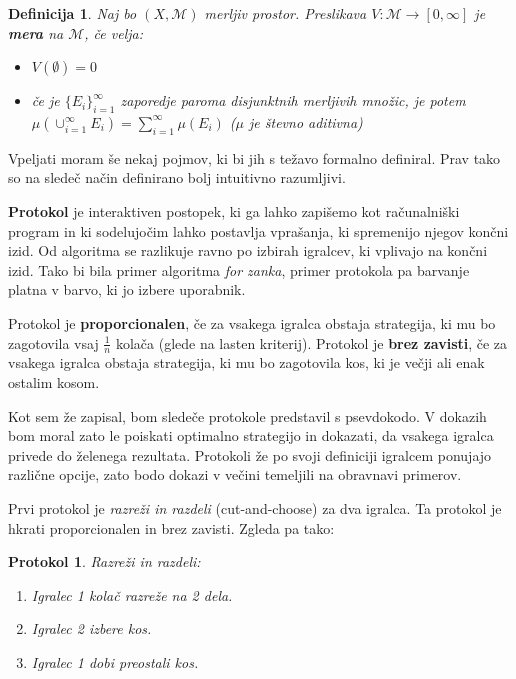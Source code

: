\documentclass[a4paper, 12pt]{article}
\newtheorem{definicija}{Definicija}
\newtheorem{protokol}{Protokol}
\begin{document}
	\begin{definicija}
		Naj bo $(X, \mathcal{M})$ merljiv prostor. Preslikava $V : \mathcal{M} \to [0, \infty]$ je \textbf{mera} na $\mathcal{M}$, če velja:
		\begin{itemize}
			\item $V(\emptyset) = 0$
			\item če je $\{E_i\}_{i=1}^{\infty}$ zaporedje paroma disjunktnih merljivih množic, je potem $\mu(\cup_{i=1}^{\infty}E_i) = \sum_{i=1}^{\infty} \mu(E_i)$ ($\mu$ je števno aditivna)
		\end{itemize}		
	\end{definicija}

	Vpeljati moram še nekaj pojmov, ki bi jih s težavo formalno definiral. Prav tako so na sledeč način definirano bolj intuitivno razumljivi.
	
	\textbf{Protokol} je interaktiven postopek, ki ga lahko zapišemo kot računalniški program in ki sodelujočim lahko postavlja vprašanja, ki spremenijo njegov končni izid. Od algoritma se razlikuje ravno po izbirah igralcev, ki vplivajo na končni izid. Tako bi bila primer algoritma \textit{for zanka}, primer protokola pa barvanje platna v barvo, ki jo izbere uporabnik.
	
	Protokol je \textbf{proporcionalen}, če za vsakega igralca obstaja strategija, ki mu bo zagotovila vsaj $\frac{1}{n}$ kolača (glede na lasten kriterij). Protokol je \textbf{brez zavisti}, če za vsakega igralca obstaja strategija, ki mu bo zagotovila kos, ki je večji ali enak ostalim kosom. 
	
	Kot sem že zapisal, bom sledeče protokole predstavil s psevdokodo. V dokazih bom moral zato le poiskati optimalno strategijo in dokazati, da vsakega igralca privede do želenega rezultata. Protokoli že po svoji definiciji igralcem ponujajo različne opcije, zato bodo dokazi v večini temeljili na obravnavi primerov.
	
	Prvi protokol je \textit{razreži in razdeli} (cut-and-choose) za dva igralca. Ta protokol je hkrati proporcionalen in brez zavisti. Zgleda pa tako:
	
	\begin{protokol} 
		\label{razrezi&razdeli}
		Razreži in razdeli:
		\begin{enumerate}
			
			\item Igralec 1 kolač razreže na 2 dela.
			
			\item Igralec 2 izbere kos.
			
			\item Igralec 1 dobi preostali kos.
			
		\end{enumerate}
	\end{protokol}
	
\end{document}
